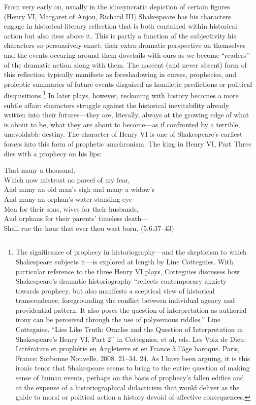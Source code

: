 From very early on, usually in the idiosyncratic depiction of certain figures (Henry VI, Margaret of Anjou, Richard III) Shakespeare has his characters engage in historical-literary reflection that is both contained within historical action but also rises above it.
This is partly a function of the subjectivity his characters so persuasively enact: their extra-dramatic perspective on themselves and the events occuring around them dovetails with ours as we become ``readers’’ of the dramatic action along with them.
The nascent (and never absent) form of this reflection typically manifests as foreshadowing in curses, prophecies, and proleptic summaries of future events disguised as homiletic predictions or political disquisitions.\footnote{The significance of prophecy in historiography---and the skepticism to which Shakespeare subjects it---is explored at length by Line Cottegnies.
With particular reference to the three Henry VI plays, Cottegnies discusses how Shakespeare’s dramatic historiography ``reflects contemporary anxiety towards prophecy, but also manifests a sceptical view of historical transcendence, foregrounding the conflict between individual agency and providential pattern.
It also poses the question of interpretation as authorial irony can be perceived through the use of polysemous riddles.’’ Line Cottegnies. ``Lies Like Truth: Oracles and the Question of Interpretation in Shakespeare’s Henry VI, Part 2’’ in Cottegnies, et al, eds. Les Voix de Dieu: Littérature et prophétie en Angleterre et en France à l'âge baroque. Paris, France: Sorbonne Nouvelle, 2008. 21--34. 24.
As I have been arguing, it is this ironic tenor that Shakespeare seems to bring to the entire question of making sense of human events, perhaps on the basis of prophecy’s fallen edifice and at the expense of a historiographical didacticism that would deliver as the guide to moral or political action a history devoid of affective consequences.} In later plays, however, reckoning with history becomes a more subtle affair: characters struggle against the historical inevitability already written into their futures---they are, literally, always at the growing edge of what is about to be, what they are about to become---as if confronted by a terrible, unavoidable destiny.
The character of Henry VI is one of Shakespeare’s earliest forays into this form of prophetic anachronism.
The king in Henry VI, Part Three dies with a prophecy on his lips:
\begin{vq}
That many a thousand, \\
Which now mistrust no parcel of my fear, \\
And many an old man’s sigh and many a widow’s \\
And many an orphan’s water-standing eye--- \\
Men for their sons, wives for their husbands, \\
And orphans for their parents’ timeless death--- \\
Shall rue the hour that ever thou wast born. (5.6.37--43) \\
\end{vq}
